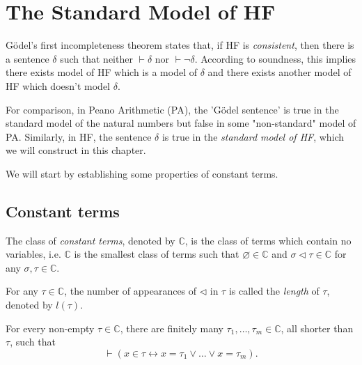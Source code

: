 \chapter{The Standard Model of HF}

Gödel's first incompleteness theorem states that, if HF is \textit{consistent}, 
then there is a sentence $\delta$ such that neither $\vdash \delta$ nor
$\vdash \neg\delta$. According to soundness, 
this implies there exists model of HF which is
a model of $\delta$ and there exists another model of HF which doesn't model $\delta$.

For comparison, in Peano Arithmetic (PA), the 'Gödel sentence' is true in the standard model of 
the natural numbers but false in some "non-standard" model of PA. 
Similarly, in HF, the sentence $\delta$ is true in the \textit{standard model of HF}, 
which we will construct in this chapter.

We will start by establishing some properties of constant terms.

\section{Constant terms}

\begin{definition}
    \label{def:C+C.length}
    \leanok
    The class of \textit{constant terms}, denoted by $\mathbb{C}$, is the class of terms which
    contain no variables, i.e. $\mathbb{C}$ is the smallest class of terms such that 
    $\varnothing \in \mathbb{C}$ and 
    $\sigma \lhd \tau \in \mathbb{C}$ for any $\sigma, \tau \in \mathbb{C}$.

    For any $\tau \in \mathbb{C}$, the number of appearances of $\lhd$ in $\tau$ is called the
    \textit{length} of $\tau$, denoted by $l(\tau)$.
\end{definition}

\begin{lemma}
    \label{lem:C.exists_finset_shorter_and_mem_iff_iSup}
    \leanok
    For every non-empty $\tau \in \mathbb{C}$, there are finitely many 
    $\tau_1, \ldots, \tau_m \in \mathbb{C}$, all shorter than $\tau$, such that
    $$
    \vdash (x \in \tau \leftrightarrow x = \tau_1 \lor \ldots \lor x = \tau_m).
    $$
\end{lemma}

